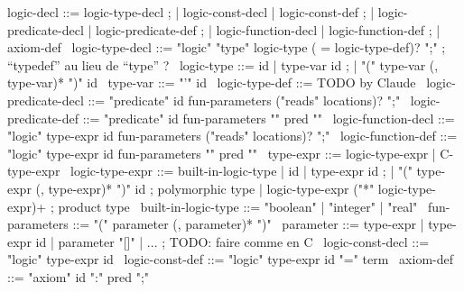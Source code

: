 \begin{syntax}
  logic-decl ::= logic-type-decl ;
          | logic-const-decl | logic-const-def ;
          | logic-predicate-decl | logic-predicate-def ;
          | logic-function-decl | logic-function-def ;
          | axiom-def
  \
  logic-type-decl ::= "logic" "type" logic-type ( = logic-type-def)? ";" ; ``typedef'' au lieu de ``type'' ?
  \
  logic-type ::= id | type-var id ;
                 | "(" type-var (, type-var)* ")" id 
                 \
  type-var ::= "'" id 
  \
  logic-type-def ::= TODO by Claude 
  \
  logic-predicate-decl ::= "predicate" id fun-parameters ("reads" locations)? ";"
  \
  logic-predicate-def ::= "predicate" id fun-parameters "{" pred "}"
  \
  logic-function-decl ::= "logic" type-expr id fun-parameters ("reads" locations)? ";"
  \
  logic-function-def ::= "logic" type-expr id fun-parameters "{" pred "}"
  \
  type-expr ::= logic-type-expr | C-type-expr
  \
  logic-type-expr ::= built-in-logic-type | id | type-expr id ;
                 | "(" type-expr (, type-expr)* ")" id ; polymorphic type
                 | logic-type-expr ("*" logic-type-expr)+  ; product type 
  \
  built-in-logic-type ::= "boolean" | "integer" | "real" 
  \
  fun-parameters ::= "(" parameter (, parameter)* ")"
  \
  parameter ::= type-expr | type-expr id | parameter "[]" | ... ; TODO: faire comme en C
  \
  logic-const-decl ::= "logic" type-expr id 
  \
  logic-const-def ::= "logic" type-expr id "=" term
  \
  axiom-def ::= "axiom" id ":" pred ";"
\end{syntax}